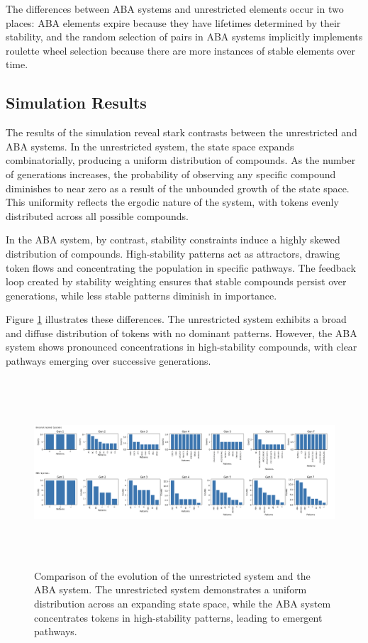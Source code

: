 \documentclass[entropy,article,submit,pdftex,oneauthor]{Definitions/mdpi}
\begin{document}
The differences between ABA systems and unrestricted elements occur in two places: ABA elements expire because they have lifetimes determined by their stability, and the random selection of pairs in ABA systems implicitly implements roulette wheel selection \cite{goldberg1989genetic} \cite{holland1975adaptation} because there are more instances of stable elements over time. 

\subsection{Simulation Results}

The results of the simulation reveal stark contrasts between the unrestricted and ABA systems. In the unrestricted system, the state space expands combinatorially, producing a uniform distribution of compounds. As the number of generations increases, the probability of observing any specific compound diminishes to near zero as a result of the unbounded growth of the state space. This uniformity reflects the ergodic nature of the system, with tokens evenly distributed across all possible compounds.

In the ABA system, by contrast, stability constraints induce a highly skewed distribution of compounds. High-stability patterns act as attractors, drawing token flows and concentrating the population in specific pathways. The feedback loop created by stability weighting ensures that stable compounds persist over generations, while less stable patterns diminish in importance.

Figure \ref{fig:simulation_results} illustrates these differences. The unrestricted system exhibits a broad and diffuse distribution of tokens with no dominant patterns. However, the ABA system shows pronounced concentrations in high-stability compounds, with clear pathways emerging over successive generations.

\begin{figure}[h]
    \centering
    \includegraphics[width=1\textwidth,height=7cm]{monte-carlo-fits.png}
    \caption{Comparison of the evolution of the unrestricted system and the ABA system. The unrestricted system demonstrates a uniform distribution across an expanding state space, while the ABA system concentrates tokens in high-stability patterns, leading to emergent pathways.}
    \label{fig:simulation_results}
\end{figure}
\end{document}
